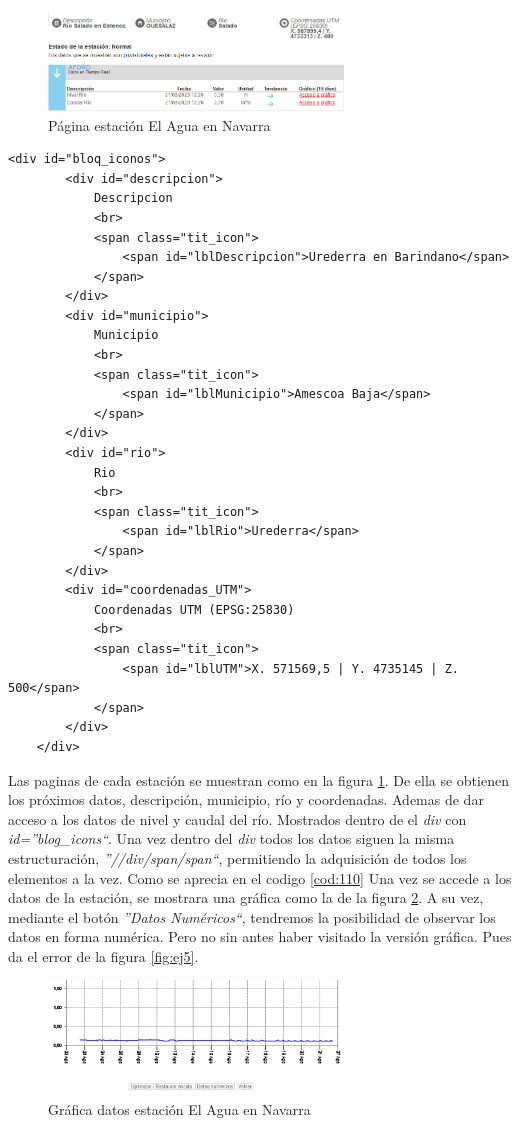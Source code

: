 \begin{figure} [H]
	\centering
	\includegraphics[width=0.7\textwidth]{fig/AguaEnNavarraEstacion.png}
	\caption[Página estación de El Agua en Navarra]{Página estación El Agua en Navarra}
	\label{fig:ej23}
\end{figure}

\begin{lstlisting}[basicstyle=\footnotesize, caption={HTML estaciones en El Agua en Navarra}, label=cod:110]
	<div id="bloq_iconos">
		<div id="descripcion">
			Descripcion
			<br>
			<span class="tit_icon">
				<span id="lblDescripcion">Urederra en Barindano</span>
			</span>
		</div>
		<div id="municipio">
			Municipio
			<br>
			<span class="tit_icon">
				<span id="lblMunicipio">Amescoa Baja</span>
			</span>
		</div>
		<div id="rio">
			Rio
			<br>
			<span class="tit_icon">
				<span id="lblRio">Urederra</span>
			</span>
		</div>
		<div id="coordenadas_UTM">
			Coordenadas UTM (EPSG:25830)
			<br>
			<span class="tit_icon">
				<span id="lblUTM">X. 571569,5 | Y. 4735145 | Z. 500</span>
			</span>
		</div>
	</div>
\end{lstlisting}

Las paginas de cada estación se muestran como en la figura \ref{fig:ej23}. De ella se obtienen los próximos datos, descripción, municipio, río y coordenadas. Ademas de dar acceso a los datos de nivel y caudal del río. Mostrados dentro de el \textit{div} con \textit{id=''blog\_icons``}. Una vez dentro del \textit{div} todos los datos siguen la misma estructuración, \textit{''//div/span/span``}, permitiendo la adquisición de todos los elementos a la vez. Como se aprecia en el codigo \ref{cod:110}\newline
\newline
Una vez se accede a los datos de la estación, se mostrara una gráfica como la de la figura \ref{fig:ej25}. A su vez, mediante el botón \textit{''Datos Numéricos``}, tendremos la posibilidad de observar los datos en forma numérica. Pero no sin antes haber visitado la versión gráfica. Pues da el error de la figura \ref{fig:ej5}.

\begin{figure} [H]
	\centering
	\includegraphics[width=0.7\textwidth]{fig/AguaEnNavarraGrafica.png}
	\caption[Gráfica de datos en estación de El Agua en Navarra]{Gráfica datos estación El Agua en Navarra}
	\label{fig:ej25}
\end{figure}

